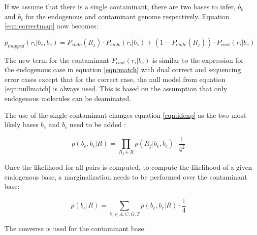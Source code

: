 \documentclass[a4paper,12pt]{article}
\begin{document}
If we assume that there is a single contaminant, there are two bases to infer, $b_e$ and $b_c$ for the endogenous and contaminant genome respectively. Equation \ref{eqn:correctmap} now becomes:

\begin{equation}
p_{mapped}(r_i|b_e,b_c) =  P_{endo}(R_j) \cdot P_{endo} (r_i|b_e)   + (1-P_{endo}(R_j)) \cdot P_{cont} (r_i|b_c)
\end{equation}

\noindent The new term for the contaminant $P_{cont} (r_i|b_c)$ is similar to the expression for the endogenous case in equation \ref{eqn:match} with dual correct and sequencing error cases except that for the correct case, the null model from equation \ref{eqn:nullmatch} is always used. This is based on the assumption that only endogenous molecules can be deaminated. 

The use of the single contaminant changes equation \ref{eqn:idenp} as the two most likely bases $b_e$ and $b_c$ need to be added :

\begin{equation}
  p(b_e,b_c|R)   = \prod_{R_j \in R} p(R_j|b_e,b_c) \cdot \frac {1} {4^2} 
\end{equation} 

\noindent Once the likelihood for all pairs is computed, to compute the likelihood of a given endogenous base, a marginalization needs to be performed over the contaminant base: 

\begin{equation}
  p(b_e|R)   = \sum_{b_c \in {A,C,G,T}} p(b_e,b_c|R) \cdot \frac {1} {4} 
\end{equation} 

\noindent The converse is used for the contaminant base. 

\end{document}
